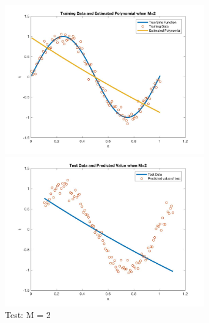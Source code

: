 \documentclass[a4paper]{article}
\begin{document}
\begin{spacing}{2.0}
	\begin{figure}[H]
	    \begin{minipage}[t]{0.5\textwidth}
	        \centering
	        \includegraphics[width=3.4in]{2train.jpeg}
	        \caption{Training: M = 2}
	        \label{fig:side:a}
	    \end{minipage}%
	  \begin{minipage}[t]{0.5\textwidth}
	      \centering
	      \includegraphics[width=3.4in]{2test.jpeg}
	      \caption{Test: M = 2}
	      \label{fig:side:b}
	    \end{minipage}
	\end{figure}
	

\end{spacing}
\end{document}
